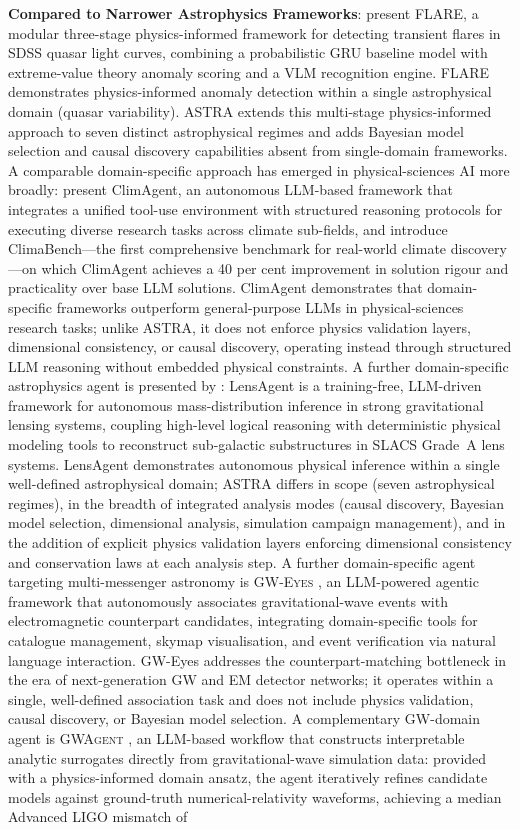 \documentclass[usenatbib]{rasti}
\begin{document}
\textbf{Compared to Narrower Astrophysics Frameworks}: \citet{agrawal2026flare} present FLARE, a modular three-stage physics-informed framework for detecting transient flares in SDSS quasar light curves, combining a probabilistic GRU baseline model with extreme-value theory anomaly scoring and a VLM recognition engine. FLARE demonstrates physics-informed anomaly detection within a single astrophysical domain (quasar variability). ASTRA extends this multi-stage physics-informed approach to seven distinct astrophysical regimes and adds Bayesian model selection and causal discovery capabilities absent from single-domain frameworks. A comparable domain-specific approach has emerged in physical-sciences AI more broadly: \citet{wang2026climagent} present ClimAgent, an autonomous LLM-based framework that integrates a unified tool-use environment with structured reasoning protocols for executing diverse research tasks across climate sub-fields, and introduce ClimaBench---the first comprehensive benchmark for real-world climate discovery---on which ClimAgent achieves a 40 per cent improvement in solution rigour and practicality over base LLM solutions. ClimAgent demonstrates that domain-specific frameworks outperform general-purpose LLMs in physical-sciences research tasks; unlike ASTRA, it does not enforce physics validation layers, dimensional consistency, or causal discovery, operating instead through structured LLM reasoning without embedded physical constraints. A further domain-specific astrophysics agent is presented by \citet{feng2026lensagent}: LensAgent is a training-free, LLM-driven framework for autonomous mass-distribution inference in strong gravitational lensing systems, coupling high-level logical reasoning with deterministic physical modeling tools to reconstruct sub-galactic substructures in SLACS Grade~A lens systems. LensAgent demonstrates autonomous physical inference within a single well-defined astrophysical domain; ASTRA differs in scope (seven astrophysical regimes), in the breadth of integrated analysis modes (causal discovery, Bayesian model selection, dimensional analysis, simulation campaign management), and in the addition of explicit physics validation layers enforcing dimensional consistency and conservation laws at each analysis step. A further domain-specific agent targeting multi-messenger astronomy is \textsc{GW-Eyes} \citep{dong2026gweyes}, an LLM-powered agentic framework that autonomously associates gravitational-wave events with electromagnetic counterpart candidates, integrating domain-specific tools for catalogue management, skymap visualisation, and event verification via natural language interaction. GW-Eyes addresses the counterpart-matching bottleneck in the era of next-generation GW and EM detector networks; it operates within a single, well-defined association task and does not include physics validation, causal discovery, or Bayesian model selection. A complementary GW-domain agent is \textsc{GWAgent} \citep{islam2026gwagent}, an LLM-based workflow that constructs interpretable analytic surrogates directly from gravitational-wave simulation data: provided with a physics-informed domain ansatz, the agent iteratively refines candidate models against ground-truth numerical-relativity waveforms, achieving a median Advanced LIGO mismatch of 
\end{document}
